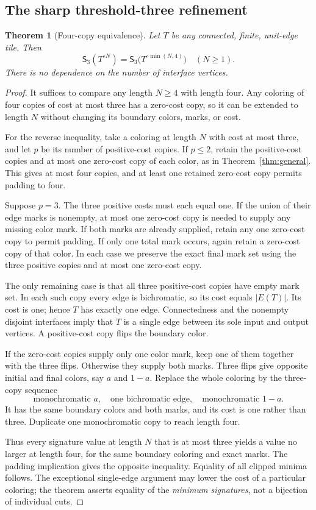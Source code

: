 \documentclass[11pt]{article}
\newtheorem{theorem}{Theorem}[section]
\theoremstyle{remark}\newtheorem{remark}[theorem]{Remark}
\newcommand{\Sig}{\mathsf S}
\begin{document}
\subsection{The sharp threshold-three refinement}
\begin{theorem}[Four-copy equivalence]
\label{thm:four}
Let $T$ be any connected, finite, unit-edge tile. Then
\begin{equation}
\boxed{\quad
 \Sig_3(T^{\circ N})
   =\Sig_3\bigl(T^{\circ\min(N,4)}\bigr)
 \quad(N\ge1).\quad}
\end{equation}
There is no dependence on the number of interface vertices.
\end{theorem}
\begin{proof}
It suffices to compare any length $N\ge4$ with length four. Any coloring of four copies of cost at most three has a zero-cost copy, so it can be extended to length $N$ without changing its boundary colors, marks, or cost.

For the reverse inequality, take a coloring at length $N$ with cost at most three, and let $p$ be its number of positive-cost copies. If $p\le2$, retain the positive-cost copies and at most one zero-cost copy of each color, as in Theorem~\ref{thm:general}. This gives at most four copies, and at least one retained zero-cost copy permits padding to four.

Suppose $p=3$. The three positive costs must each equal one. If the union of their edge marks is nonempty, at most one zero-cost copy is needed to supply any missing color mark. If both marks are already supplied, retain any one zero-cost copy to permit padding. If only one total mark occurs, again retain a zero-cost copy of that color. In each case we preserve the exact final mark set using the three positive copies and at most one zero-cost copy.

The only remaining case is that all three positive-cost copies have empty mark set. In each such copy every edge is bichromatic, so its cost equals $|E(T)|$. Its cost is one; hence $T$ has exactly one edge. Connectedness and the nonempty disjoint interfaces imply that $T$ is a single edge between its sole input and output vertices. A positive-cost copy flips the boundary color.

If the zero-cost copies supply only one color mark, keep one of them together with the three flips. Otherwise they supply both marks. Three flips give opposite initial and final colors, say $a$ and $1-a$. Replace the whole coloring by the three-copy sequence
\[
 \text{monochromatic }a,
 \quad\text{one bichromatic edge},
 \quad\text{monochromatic }1-a.
\]
It has the same boundary colors and both marks, and its cost is one rather than three. Duplicate one monochromatic copy to reach length four.

Thus every signature value at length $N$ that is at most three yields a value no larger at length four, for the same boundary coloring and exact marks. The padding implication gives the opposite inequality. Equality of all clipped minima follows. The exceptional single-edge argument may lower the cost of a particular coloring; the theorem asserts equality of the \emph{minimum signatures}, not a bijection of individual cuts.
\end{proof}
\end{document}
